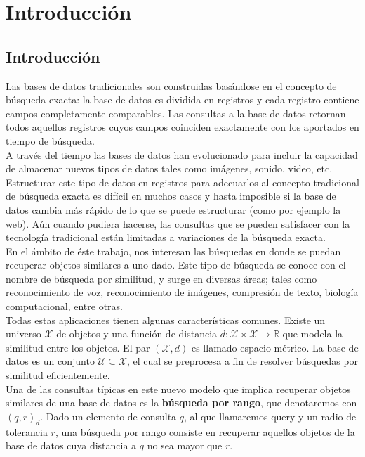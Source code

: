 \chapter{Introducci\'on}

\section{Introducci\'on}
Las bases de datos tradicionales son construidas bas\'andose en el concepto de b\'usqueda exacta: la base de datos es dividida en registros y cada registro contiene campos completamente comparables. Las consultas a la base de datos retornan todos aquellos registros cuyos campos coinciden exactamente con los aportados en tiempo de b\'usqueda.\\
				
A trav\'es del tiempo las bases de datos han evolucionado para incluir la capacidad de almacenar nuevos tipos de datos tales como im\'agenes, sonido, video, etc. Estructurar este tipo de datos en registros para adecuarlos al concepto tradicional de b\'usqueda exacta es dif\'icil en muchos casos y hasta imposible si la base de datos cambia m\'as r\'apido de lo que se puede estructurar (como por ejemplo la web). A\'un cuando pudiera hacerse, las consultas que se pueden satisfacer con la tecnolog\'ia tradicional est\'an limitadas a variaciones de la b\'usqueda exacta.\\
					
En el \'ambito de \'este trabajo, nos interesan las b\'usquedas en donde se puedan recuperar objetos similares a uno dado. Este tipo de b\'usqueda se conoce con el nombre de b\'usqueda por similitud, y surge en diversas \'areas; tales como reconocimiento de voz, reconocimiento de im\'agenes, compresi\'on de texto, biolog\'ia computacional, entre otras.\\
					
Todas estas aplicaciones tienen algunas caracter\'isticas comunes. Existe un universo $\mathcal{X}$ de objetos y una funci\'on de distancia $d: \mathcal{X} \times \mathcal{X} \rightarrow \mathbb R$ que modela la similitud entre los objetos. El par $(\mathcal{X}, d)$ es llamado espacio m\'etrico. La base de datos es un conjunto $\mathcal{U} \subseteq \mathcal{X}$, el cual se preprocesa a fin de resolver b\'usquedas por similitud eficientemente.\\
					
Una de las consultas t\'ipicas en este nuevo modelo que implica recuperar objetos similares de una base de datos es la \textbf{b\'usqueda por rango}, que denotaremos con $(q, r)_d$. Dado un elemento de consulta $q$, al que llamaremos query y un radio de tolerancia $r$, una b\'usqueda por rango consiste en recuperar aquellos objetos de la base de datos cuya distancia a $q$ no sea mayor que $r$.\\

